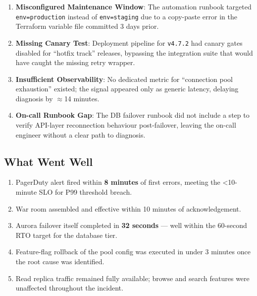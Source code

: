 \documentclass[11pt,a4paper]{article}
\begin{document}
\begin{enumerate}[leftmargin=*, itemsep=2pt, label=\textcolor{accent}{\bfseries\arabic*.}]
  \item \textbf{Misconfigured Maintenance Window}: The automation runbook targeted
    \texttt{env=production} instead of \texttt{env=staging} due to a copy-paste error
    in the Terraform variable file committed 3 days prior.

  \item \textbf{Missing Canary Test}: Deployment pipeline for \texttt{v4.7.2} had canary
    gates disabled for ``hotfix track'' releases, bypassing the integration suite that
    would have caught the missing retry wrapper.

  \item \textbf{Insufficient Observability}: No dedicated metric for ``connection pool
    exhaustion'' existed; the signal appeared only as generic latency, delaying diagnosis
    by $\approx$14 minutes.

  \item \textbf{On-call Runbook Gap}: The DB failover runbook did not include a step to
    verify API-layer reconnection behaviour post-failover, leaving the on-call engineer
    without a clear path to diagnosis.
\end{enumerate}

\subsection{What Went Well}

\begin{enumerate}[leftmargin=*, itemsep=2pt, label=\textcolor{statusdone}{\bfseries\arabic*.}]
  \item PagerDuty alert fired within \textbf{8 minutes} of first errors, meeting the
    \textless{}10-minute SLO for P99 threshold breach.
  \item War room assembled and effective within 10 minutes of acknowledgement.
  \item Aurora failover itself completed in \textbf{32 seconds} --- well within the
    60-second RTO target for the database tier.
  \item Feature-flag rollback of the pool config was executed in under 3 minutes once
    the root cause was identified.
  \item Read replica traffic remained fully available; browse and search features were
    unaffected throughout the incident.
\end{enumerate}
\end{document}
